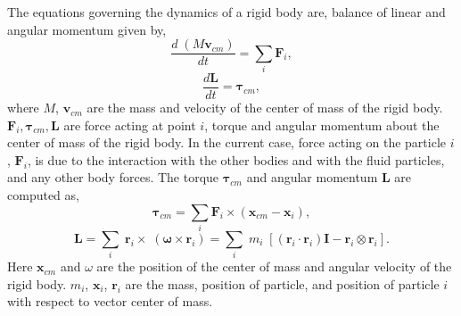 \documentclass[preprint,12pt]{elsarticle}
\newcommand{\teng}[1]{\ensuremath{\boldsymbol{#1}}}
\newcommand{\ten}[1]{\ensuremath{\mathbf{#1}}}
\begin{document}


The equations governing the dynamics of a rigid body are, balance of linear and
angular momentum given by,
\begin{equation}
  \label{eq:rfc:balance_linear_mom}
  \frac{d \; (M \ten{v}_{cm})}{d t} = \sum_i \ten{F}_i,
\end{equation}
\begin{equation}
  \label{eq:rfc:balance_angular_mom}
  \frac{d \ten{L}}{d t} = \teng{\tau}_{cm},
\end{equation}
where $M$, $\ten{v}_{cm}$ are the mass and velocity of the center of mass of the rigid body.
$\ten{F}_i, \teng{\tau}_{cm}, \ten{L} $ are force acting at point $i$, torque and
angular momentum about the center of mass of the rigid body. In the current
case, force acting on the particle $i$, $\ten{F}_i$, is due to the interaction
with the other bodies and with the fluid particles, and any other body forces.
The torque $\teng{\tau}_{cm}$ and angular momentum $\ten{L}$ are computed as,
\begin{equation}
  \label{eq:rfc:torque}
 \teng{\tau}_{cm} = \sum_i \ten{F}_i \times (\ten{x}_{cm} - \ten{x}_{i}),
\end{equation}
\begin{equation}
  \label{eq:rfc:moi}
  \teng{L} =
  \sum_i \; \ten{r}_i \times \; (\teng{\omega} \times \ten{r}_i)
  = \sum_i \; m_i \; [(\ten{r}_i \cdot \ten{r}_i) \ten{I} - \ten{r}_i \otimes \ten{r}_i].
\end{equation}
Here $\ten{x}_{cm}$ and $\omega$ are the position of the center of mass and
angular velocity of the rigid body. $m_i$, $\ten{x}_{i}$, $\ten{r}_i$ are the
mass, position of particle, and position of particle $i$ with respect to vector
center of mass.
\end{document}
